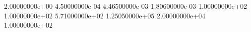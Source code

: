  2.00000000e+00
 4.50000000e-04
 4.46500000e-03
 1.80600000e-03
 1.00000000e+02
 1.00000000e+02
 5.71000000e+02
 1.25050000e+05
 2.00000000e+04
 1.00000000e+02
